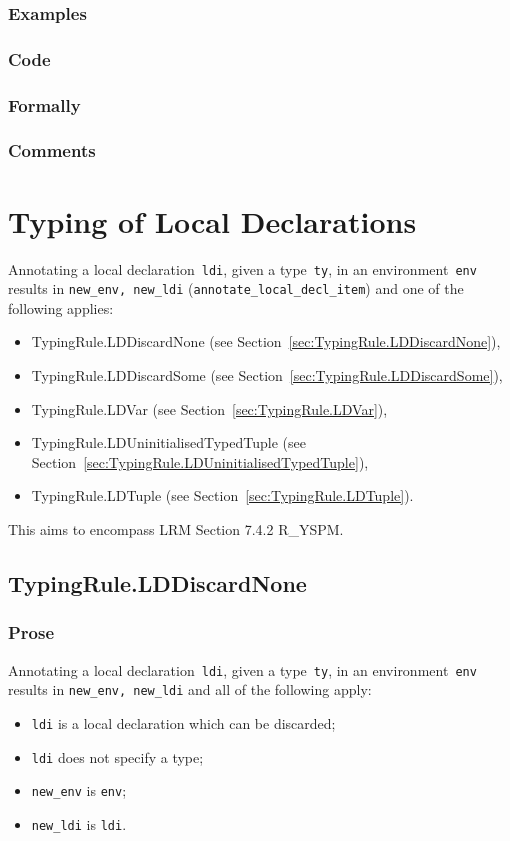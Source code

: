 \documentclass{book}
\begin{document}
  \subsection{Examples}

  \subsection{Code}

  \subsection{Formally}

  \subsection{Comments}

\chapter{Typing of Local Declarations}
Annotating a local declaration~\texttt{ldi}, given a type~\texttt{ty}, in an
environment~\texttt{env} results in \texttt{new\_env, new\_ldi}
(\texttt{annotate\_local\_decl\_item}) and one of the following applies:
\begin{itemize}
\item TypingRule.LDDiscardNone (see Section~\ref{sec:TypingRule.LDDiscardNone}),
\item TypingRule.LDDiscardSome (see Section~\ref{sec:TypingRule.LDDiscardSome}),
\item TypingRule.LDVar (see Section~\ref{sec:TypingRule.LDVar}),
\item TypingRule.LDUninitialisedTypedTuple (see Section~\ref{sec:TypingRule.LDUninitialisedTypedTuple}),
\item TypingRule.LDTuple (see Section~\ref{sec:TypingRule.LDTuple}).
\end{itemize}

This aims to encompass LRM Section 7.4.2 R\_YSPM.

\section{TypingRule.LDDiscardNone \label{sec:TypingRule.LDDiscardNone}}

  \subsection{Prose}
    Annotating a local declaration~\texttt{ldi}, given a type~\texttt{ty}, in
an environment~\texttt{env} results in \texttt{new\_env, new\_ldi} and all of
the following apply:
   \begin{itemize}
   \item \texttt{ldi} is a local declaration which can be discarded;
   \item \texttt{ldi} does not specify a type;
   \item \texttt{new\_env} is \texttt{env};
   \item \texttt{new\_ldi} is \texttt{ldi}.
   \end{itemize}
\end{document}
